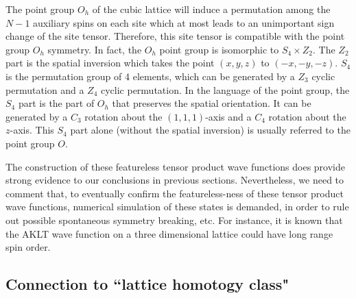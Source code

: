 \documentclass[aps,prb,twocolumn,superscriptaddress,showpacs]{revtex4}
\begin{document}
The point group $O_h$ of the cubic lattice will induce a
permutation among the $N-1$ auxiliary spins on each site which at
most leads to an unimportant sign change of the site tensor.
Therefore, this site tensor is compatible with the point group
$O_h$ symmetry. In fact, the $O_h$ point group is isomorphic to
$S_4 \times Z_2$. The $Z_2$ part is the spatial inversion which
takes the point $(x,y,z)$ to $(-x,-y,-z)$. $S_4$ is the
permutation group of 4 elements, which can be generated by a $Z_3$
cyclic permutation and a $Z_4$ cyclic permutation. In the language
of the point group, the $S_4$ part is the part of $O_h$ that
preserves the spatial orientation. It can be generated by a $C_3$
rotation about the $(1,1,1)$-axis and a $C_4$ rotation about the
$z$-axis. This $S_4$ part alone (without the spatial inversion) is
usually referred to the point group $O$.

The construction of these featureless tensor product wave
functions does provide strong evidence to our conclusions in
previous sections. Nevertheless, we need to comment that, to
eventually confirm the featureless-ness of these tensor product
wave functions, numerical simulation of these states is demanded,
in order to rule out possible spontaneous symmetry breaking, etc.
For instance, it is known that the AKLT wave function on a three
dimensional lattice could have long range spin order.

\subsection{Connection to ``lattice homotogy class"}
\end{document}
